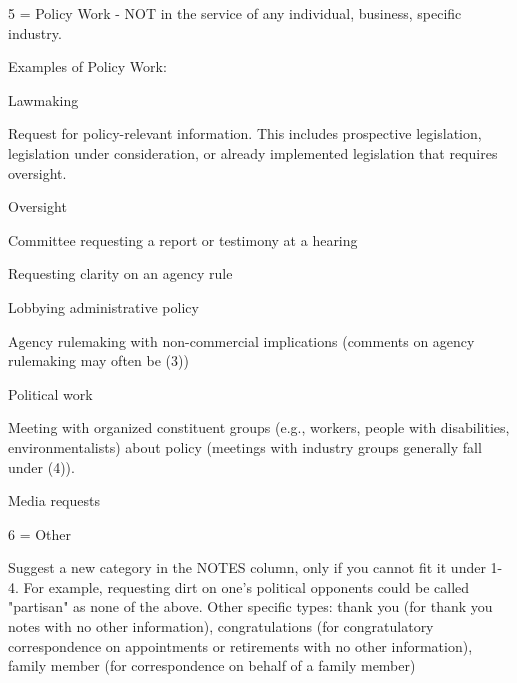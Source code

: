 \documentclass[12pt]{article}
\newenvironment{tight_itemize}{
\begin{itemize}
 \setlength{\itemsep}{0pt}
 \setlength{\parskip}{0pt}
 }{\end{itemize}}
\begin{document}
5 = Policy Work - NOT in the service of any individual, business, specific industry.\\

\hfill\begin{minipage}{\dimexpr\textwidth-2cm}
Examples of Policy Work: 
 \begin{tight_itemize} 
 \item Lawmaking 
\item Request for policy-relevant information. This includes prospective legislation, legislation under consideration, or already implemented legislation that requires oversight.  
\item Oversight
\item Committee requesting a report or testimony at a hearing
\item Requesting clarity on an agency rule
\item Lobbying administrative policy
\item Agency rulemaking with non-commercial implications (comments on agency rulemaking may often be (3)) 
\item Political work
\item Meeting with organized constituent groups (e.g., workers, people with disabilities, environmentalists) about policy (meetings with industry groups generally fall under (4)).
\item Media requests
 \end{tight_itemize} 
\end{minipage}
\bigskip


6 = Other \\

\hfill\begin{minipage}{\dimexpr\textwidth-2cm}
	Suggest a new category in the NOTES column, only if you cannot fit it under 1-4. For example, requesting dirt on one's political opponents could be called "partisan" as none of the above. Other specific types: thank you (for thank you notes with no other information), congratulations (for congratulatory correspondence on appointments or retirements with no other information), family member (for correspondence on behalf of a family member) \\
\end{minipage}
\end{document}
